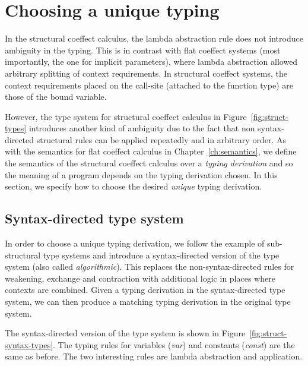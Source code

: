 
\section{Choosing a unique typing}
\label{sec:struct-unique}

In the structural coeffect calculus, the lambda abstraction rule does not introduce ambiguity
in the typing. This is in contrast with flat coeffect systems (most importantly, the one for
implicit parameters), where lambda abstraction allowed arbitrary splitting of context requirements.
In structural coeffect systems, the context requirements placed on the call-site (attached to
the function type) are those of the bound variable.

However, the type system for structural coeffect calculus in Figure~\ref{fig:struct-types}
introduces another kind of ambiguity due to the fact that non syntax-directed structural rules
can be applied repeatedly and in arbitrary order. As with the semantics for flat coeffect calculus
in Chapter~\ref{ch:semantics}, we define the semantics of the structural coeffect calculus over
a \emph{typing derivation} and so the meaning of a program depends on the typing derivation chosen.
In this section, we specify how to choose the desired \emph{unique} typing derivation.


\subsection{Syntax-directed type system}

In order to choose a unique typing derivation, we follow the example of sub-structural type systems
\cite{substruct-attpl-intro} and introduce a syntax-directed version of the type system (also called
\emph{algorithmic}). This replaces the non-syntax-directed rules for weakening, exchange and
contraction with additional logic in places where contexts are combined. Given a typing derivation
in the syntax-directed type system, we can then produce a matching typing derivation in the original
type system.

The syntax-directed version of the type system is shown in Figure~\ref{fig:struct-syntax-types}.
The typing rules for variables (\emph{var}) and constants (\emph{const}) are the same as before.
The two interesting rules are lambda abstraction and application.

